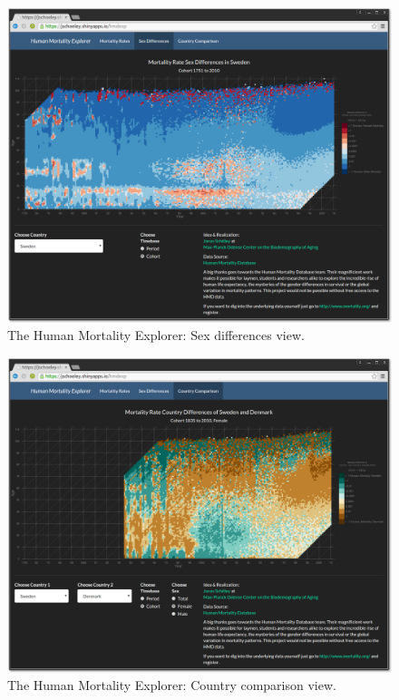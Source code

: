 \documentclass[
  12pt
]{scrartcl}
\begin{document}
\begin{figure}[ht!]
  \includegraphics[width = \linewidth]{./fig/hmd_screen_mx_sex_diff.png}
  \caption{The Human Mortality Explorer: Sex differences view.}
  \label{fig:mx_sex_diff}
\end{figure}

\begin{figure}[ht!]
  \includegraphics[width = \linewidth]{./fig/hmd_screen_mx_cntry_diff.png}
  \caption{The Human Mortality Explorer: Country comparison view.}
  \label{fig:mx_cntry_diff}
\end{figure}

\clearpage


\sloppy
\printbibliography




\end{document}
